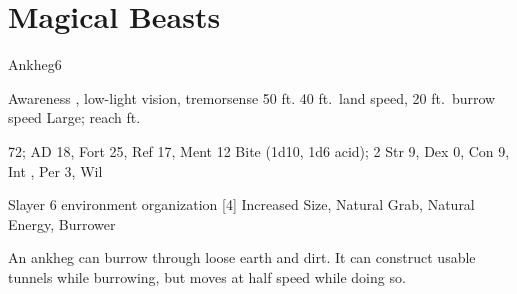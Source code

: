 \section{Magical Beasts}\label{Magical Beasts}

    \begin{monsection}{Ankheg}{6}
        \begin{spellcontent}
            \begin{spelltargetinginfo}
                \pari {} Awareness , low-light vision, tremorsense 50 ft.
                \pari {} 40 ft.\ land speed, 20 ft.\ burrow speed
                \pari {} Large;  reach ft.
            \end{spelltargetinginfo}
            \begin{spelleffects}
                \pari {} 72;  AD 18, Fort 25, Ref 17, Ment 12
                \pari {} Bite  (1d10, 1d6 acid);  2
                \pari {} Str 9, Dex 0, Con 9, Int , Per 3, Wil 
            \end{spelleffects}
        \end{spellcontent}
        \begin{spellfooter}
            \pari {} Slayer 6
            \pari {} environment
            \pari {} organization
            \pari {} [4] Increased Size, Natural Grab, Natural Energy, Burrower
        \end{spellfooter}
    \end{monsection}
     An ankheg can burrow through loose earth and dirt.
    It can construct usable tunnels while burrowing, but moves at half speed while doing so.
